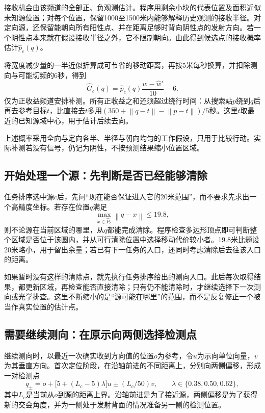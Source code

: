 \documentclass[UTF8,a4paper,12pt,fontset=fandol]{ctexart}
\newcommand{\norm}[1]{\left\lVert#1\right\rVert}
\begin{document}
接收机会由该频道的全部正、负观测估计。程序用剩余小块的代表位置及面积近似未知源位置；对每个位置，保留1000至1500米内能够解释历史观测的接收半径。对定向源，还保留能朝向所有阳性点、并在距离足够时背向阴性点的发射方向。若一个阴性点本来就在假设接收半径之外，它不限制朝向。由此得到候选点的接收概率估计$\widehat p_c(q)$。

将宽度减少量的一半近似折算成可节省的移动距离，再按5米每秒换算，并扣除测向与可能切频的6秒，得到
\begin{equation}\label{eq:sharedscore}
\widehat G_c(q)=\widehat p_c(q)\frac{w-\widehat w'}{10}-6.
\end{equation}
仅为正收益频道安排补测。所有正收益之和还须超过绕行时间：从搜索站$p$绕到$q$后再去参考目标$t$，比直接去$t$多用$(350+\norm{q-t}-\norm{p-t})/5$秒。这里$t$取最近的已知源域中心，用于估计后续去向。

上述概率采用全向与定向各半、半径与朝向均匀的工作假设，只用于比较行动。实际补测若没有信号，仍记为阴性，不按预测结果缩小位置区域。

\subsection{开始处理一个源：先判断是否已经能够清除}
任务排序选中源$c$后，先问“现在能否保证进入它的20米范围”，而不要求先求出一个高精度坐标。若存在位置$q$满足
\begin{equation}
\max_{x\in\widehat P_c}\norm{q-x}\le19.8,
\end{equation}
则不论源在当前区域的哪里，从$q$都能完成清除。程序检查多边形顶点即可判断整个区域是否位于该圆内，并从可行清除位置中选择移动代价较小者。19.8米比题设20米略小，用于留出余量；若已有下一任务的入口，还同时考虑清除后去往该入口的距离。

如果暂时没有这样的清除点，就先执行任务排序给出的测向入口。此后每次取得结果，都更新区域，再检查能否直接清除；只有仍不能清除时，才继续选择下一次测向或光学排查。这里不断缩小的是“源可能在哪里”的范围，而不是反复修正一个被当作真实位置的估计点。

\subsection{需要继续测向：在原示向两侧选择检测点}
继续测向时，以最近一次确实收到方向值的位置$o$为参考，令$u$为示向单位向量，$v$为其垂直方向。首次定位阶段，在沿轴前进的不同距离上，分别向两侧偏移，形成一对检测点
\begin{equation}
q_{\pm}=o+\bigl[5+(L_c-5)\lambda\bigr]u\pm(L_c/50)v,
\qquad\lambda\in\{0.38,0.50,0.62\},
\end{equation}
其中$L_c$是当前从$o$到源的距离上界。沿轴前进是为了接近源，两侧偏移是为了获得新的交会角度，并为一侧处于发射背面的情况准备另一侧的检测位置。
\end{document}
